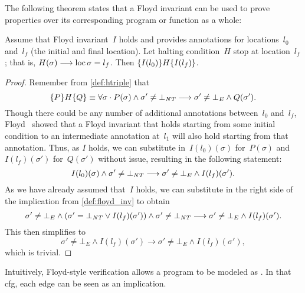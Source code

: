 The following theorem states that a Floyd invariant
can be used to prove properties over its corresponding program or function
as a whole:
\begin{theorem}
  Assume that Floyd invariant~$I$ holds and provides annotations for locations~$l_0$ and~$l_f$ (the initial and final location).
  Let halting condition~$H$ stop at location~$l_f$;%
  that is, $H(\sigma)\longrightarrow\operatorname{loc}\sigma=l_f$.
  Then $\{I(l_0)\}H\{I(l_f)\}$.
\end{theorem}
\begin{proof}
  Remember from \cref{def:htriple} that
  \begin{equation*}
    \{P\}H\{Q\}\equiv\forall\sigma\cdot
    P(\sigma)\wedge\sigma'\neq\bot_{\mathit{NT}}\longrightarrow
    \sigma'\neq\bot_E\wedge Q(\sigma').
  \end{equation*}
  Though there could be any number of additional annotations between~$l_0$
  and~$l_f$, Floyd~\citep{floyd1967assigning} showed that a Floyd invariant that holds
  starting from some initial condition to an intermediate annotation at~$l_1$
  will also hold starting from that annotation.
  Thus, as $I$ holds, we can substitute in~$I(l_0)(\sigma)$ for~$P(\sigma)$
  and~$I(l_f)(\sigma')$ for~$Q(\sigma')$ without issue,
  resulting in the following statement:
  \begin{equation*}
      I(l_0)(\sigma)\wedge\sigma'\neq\bot_{\mathit{NT}}\longrightarrow
      \sigma'\neq\bot_E\wedge I(l_f)(\sigma').
  \end{equation*}
  As we have already assumed that~$I$ holds,
  we can substitute in the right side of the implication from \cref{def:floyd_inv}
  to obtain
  \begin{equation*}
    \sigma'\neq\bot_E\wedge(\sigma'=\bot_{\mathit{NT}}\vee I(l_f)(\sigma'))\wedge
    \sigma'\neq\bot_{\mathit{NT}}\longrightarrow
    \sigma'\neq\bot_E\wedge I(l_f)(\sigma').
  \end{equation*}
  This then simplifies to 
  \begin{equation*}
    \sigma'\neq\bot_E\wedge I(l_f)(\sigma')\longrightarrow
    \sigma'\neq\bot_E\wedge I(l_f)(\sigma'),
  \end{equation*}
  which is trivial.
\end{proof}

Intuitively, Floyd-style verification allows a program to be modeled as .%
In that \ac{cfg}, each edge can be seen as an implication.

